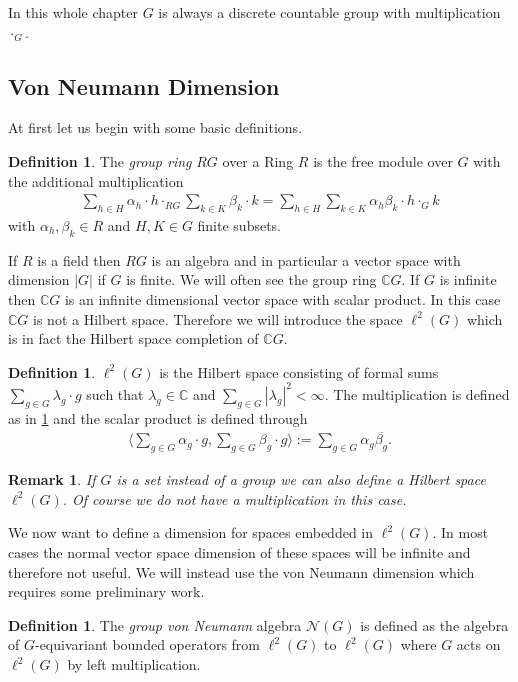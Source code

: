 \documentclass[12pt,a4paper]{scrartcl}
\theoremstyle{plain}
\newtheorem{Remark}[Theorem]{Remark}
\theoremstyle{definition}
\newtheorem{Definition}[Theorem]{Definition}
\numberwithin{equation}{section}
\newcommand{\C}{\mathbb{C}} %
\newcommand{\2}{\mathbb{Z} / 2 \mathbb{Z}}
\newcommand{\1}{\bar{1}}
\newcommand{\0}{\bar{0}}
\begin{document}
In this whole chapter $G$ is always a discrete countable group with multiplication $\cdot_G$.
\subsection{Von Neumann Dimension} \label{fiss}
At first let us begin with some basic definitions.
\begin{Definition} \label{GR}
	The \emph{group ring} $RG$ over a Ring $R$ is the free module over $G$ with the additional multiplication
	\begin{align*}
		\sum_{h \in H} \alpha_h \cdot h \cdot_{RG} \sum_{k \in K} \beta_k \cdot k = \sum_{h \in H} \sum_{k \in K} \alpha_h \beta_k \cdot h \cdot_G k
	\end{align*}
	with $\alpha_h, \beta_k \in R$ and $H, K \in G$ finite subsets.
\end{Definition}
If $R$ is a field then $RG$ is an algebra and in particular a vector space with dimension $|G|$ if $G$ is finite. We will often see the group ring $\C G$. If $G$ is infinite then $\C G$ is an infinite dimensional vector space with scalar product. In this case $\C G$ is not a Hilbert space. Therefore we will introduce the space $\ell^2(G)$ which is in fact the Hilbert space completion of $\C G$.
\begin{Definition}
	$\ell^2(G)$ is the Hilbert space consisting of formal sums $\sum_{g \in G} \lambda_g \cdot g$ such that $\lambda_g \in \C$ and $\sum_{g \in G} |\lambda_g|^2 < \infty$. The multiplication is defined as in \ref{GR} and the scalar product is defined through
	\begin{align*}
		\langle \sum_{g \in G} \alpha_g \cdot g, \sum_{g \in G} \beta_g \cdot g \rangle := \sum_{g \in G} \alpha_g \overline{\beta_g}.
	\end{align*}
\end{Definition}
\begin{Remark}
	If $G$ is a set instead of a group we can also define a Hilbert space $\ell^2(G)$. Of course we do not have a multiplication in this case.
\end{Remark}
We now want to define a dimension for spaces embedded in $\ell^2(G)$. In most cases the normal vector space dimension of these spaces will be infinite and therefore not useful. We will instead use the von Neumann dimension which requires some preliminary work.
\begin{Definition}
	The \emph{group von Neumann} algebra $\mathcal{N}(G)$ is defined as the algebra of $G$-equivariant bounded operators from $\ell^2(G)$ to $\ell^2(G)$ where $G$ acts on $\ell^2(G)$ by left multiplication.
\end{Definition}
\end{document}

